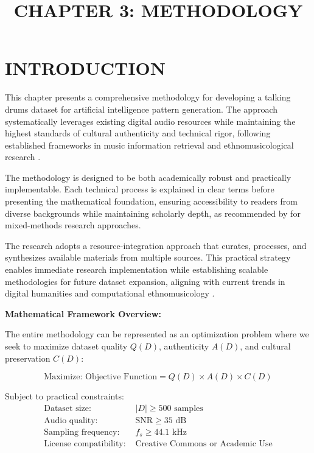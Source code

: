 \documentclass[12pt,a4paper]{article}
\title{\textbf{CHAPTER 3: METHODOLOGY}}
\author{}
\date{}
\begin{document}
\maketitle

\section{INTRODUCTION}

This chapter presents a comprehensive methodology for developing a talking drums dataset for artificial intelligence pattern generation. The approach systematically leverages existing digital audio resources while maintaining the highest standards of cultural authenticity and technical rigor, following established frameworks in music information retrieval \citep{muller2015music, lerch2012introduction} and ethnomusicological research \citep{nettl2005study, titon2017worlds}.

The methodology is designed to be both academically robust and practically implementable. Each technical process is explained in clear terms before presenting the mathematical foundation, ensuring accessibility to readers from diverse backgrounds while maintaining scholarly depth, as recommended by \citet{creswell2014research} for mixed-methods research approaches.

The research adopts a resource-integration approach that curates, processes, and synthesizes available materials from multiple sources. This practical strategy enables immediate research implementation while establishing scalable methodologies for future dataset expansion, aligning with current trends in digital humanities \citep{moretti2013distant, hockey2004history} and computational ethnomusicology \citep{serra2011roadmap, fuentes2007computational}.

\textbf{Mathematical Framework Overview:}

The entire methodology can be represented as an optimization problem where we seek to maximize dataset quality $Q(D)$, authenticity $A(D)$, and cultural preservation $C(D)$:

\begin{equation}
\text{Maximize: } \text{Objective Function} = Q(D) \times A(D) \times C(D)
\end{equation}

Subject to practical constraints:
\begin{align}
\text{Dataset size: } &|D| \geq 500 \text{ samples} \\
\text{Audio quality: } &\text{SNR} \geq 35 \text{ dB} \\
\text{Sampling frequency: } &f_s \geq 44.1 \text{ kHz} \\
\text{License compatibility: } &\text{Creative Commons or Academic Use}
\end{align}
\end{document}
